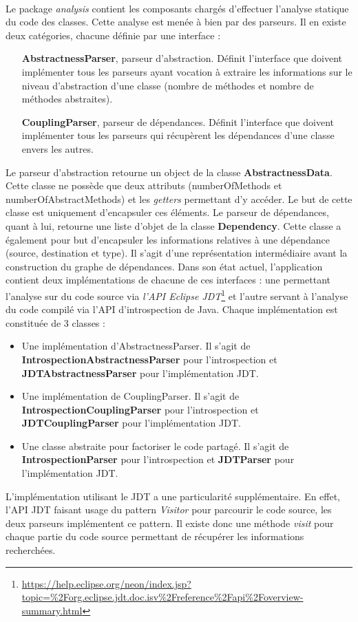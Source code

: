 \documentclass{scrartcl}
\begin{document}
    \paragraph{} Le package \textit{analysis} contient les composants chargés d'effectuer l'analyse statique du code des classes. Cette analyse est menée à bien par des parseurs. Il en existe deux catégories, chacune définie par une interface :
    \begin{itemize}
        \item[\textbf{AbstractnessParser}, parseur d'abstraction.] Définit l'interface que doivent implémenter tous les parseurs ayant vocation à extraire les informations sur le niveau d'abstraction d'une classe (nombre de méthodes et nombre de méthodes abstraites).
        \item[\textbf{CouplingParser}, parseur de dépendances.] Définit l'interface que doivent implémenter tous les parseurs qui récupèrent les dépendances d'une classe envers les autres.
    \end{itemize}
    Le parseur d'abstraction retourne un object de la classe \textbf{AbstractnessData}. Cette classe ne possède que deux attributs (numberOfMethods et numberOfAbstractMethods) et les \textit{getters} permettant d'y accéder. Le but de cette classe est uniquement d'encapsuler ces éléments.
    Le parseur de dépendances, quant à lui, retourne une liste d'objet de la classe \textbf{Dependency}. Cette classe a également pour but d'encapsuler les informations relatives à une dépendance (source, destination et type). Il s'agit d'une représentation intermédiaire avant la construction du graphe de dépendances.
    Dans son état actuel, l'application contient deux implémentations de chacune de ces interfaces : une permettant l'analyse sur du code source via \emph{l'API Eclipse JDT}\footnote{\url{https://help.eclipse.org/neon/index.jsp?topic=\%2Forg.eclipse.jdt.doc.isv\%2Freference\%2Fapi\%2Foverview-summary.html}} et l'autre servant à l'analyse du code compilé via l'API d'introspection de Java. Chaque implémentation est constituée de 3 classes :
    \begin{itemize}
        \item Une implémentation d'AbstractnessParser. Il s'agit de \textbf{IntrospectionAbstractnessParser} pour l'introspection et \textbf{JDTAbstractnessParser} pour l'implémentation JDT.
        \item Une implémentation de CouplingParser. Il s'agit de \textbf{IntrospectionCouplingParser} pour l'introspection et \textbf{JDTCouplingParser} pour l'implémentation JDT.
        \item Une classe abstraite pour factoriser le code partagé. Il s'agit de \textbf{IntrospectionParser} pour l'introspection et \textbf{JDTParser} pour l'implémentation JDT.
    \end{itemize}
    L'implémentation utilisant le JDT a une particularité supplémentaire. En effet, l'API JDT faisant usage du pattern \emph{Visitor} pour parcourir le code source, les deux parseurs implémentent ce pattern. Il existe donc une méthode \emph{visit} pour chaque partie du code source permettant de récupérer les informations recherchées.
    
\end{document}
